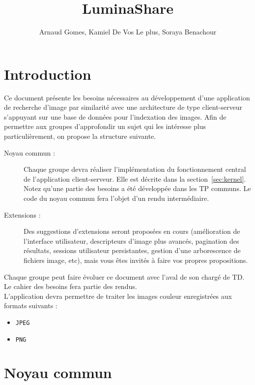 \documentclass[a4paper,12pt]{article}
\title{\sffamily \textbf{LuminaShare}}
\author{Arnaud Gomes, Kamiel De Vos Le plus, Soraya Benachour}
\date{}
\newcounter{besoin}
\begin{document}
\maketitle


\section{Introduction}

Ce document présente les besoins nécessaires au développement d'une application
de recherche d'image par similarité avec une architecture de type client-serveur s'appuyant sur une base de données pour l'indexation des images.
Afin de permettre aux groupes d'approfondir un sujet qui les intéresse plus
particulièrement, on propose la structure suivante.

\begin{description}
\item[Noyau commun :] Chaque groupe devra réaliser l'implémentation du fonctionnement central de l'application client-serveur. Elle est décrite dans la section~\ref{sec:kernel}. Notez qu'une partie des besoins a été développée dans les TP communs. Le code du noyau commun fera l'objet d'un rendu intermédiaire.
  
\item [Extensions :] Des suggestions d'extensions seront proposées en cours (amélioration de l'interface utilisateur, descripteurs d'image plus avancés, pagination des résultats, sessions utilisateur persistantes, gestion d'une arborescence de fichiers image, etc), mais vous êtes invités à faire vos propres propositions.
  
\end{description}


Chaque groupe peut faire évoluer ce document avec l'aval de son chargé de TD. Le cahier des besoins fera partie des rendus.\\


L'application devra permettre de traiter les images couleur enregistrées aux formats suivants :

\begin{itemize}
\item \verb!JPEG!
\item \verb!PNG!
\end{itemize}



\section{\label{sec:kernel}Noyau commun}
\end{document}
